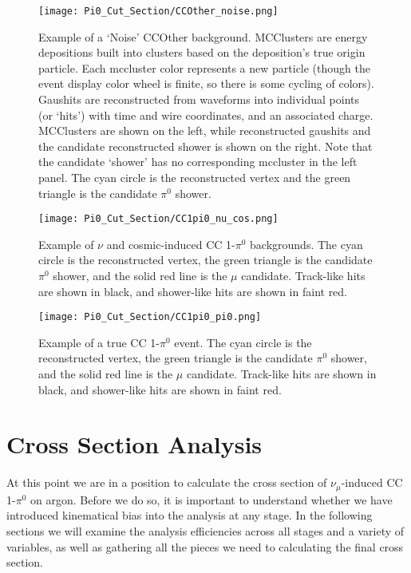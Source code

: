 \begin{figure}[H]
\centering
\texttt{[image: Pi0\_Cut\_Section/CCOther\_noise.png]}
\caption{ Example of a `Noise' CCOther background. MCClusters are energy depositions built into clusters based on the deposition’s true origin particle. Each mccluster color represents a new particle (though the event display color wheel is finite, so there is some cycling of colors).  Gaushits are reconstructed from waveforms into individual points (or `hits') with time and wire coordinates, and an associated charge. MCClusters are shown on the left, while reconstructed gaushits and the candidate reconstructed shower is shown on the right.
 Note that the candidate `shower' has no corresponding mccluster in the left panel. The cyan circle is the reconstructed vertex and the green triangle is the candidate $\pi^0$ shower.  }
\label{fig:ccoth_bkgd_noise}
\end{figure}

\begin{figure}[H]
\centering
\texttt{[image: Pi0\_Cut\_Section/CC1pi0\_nu\_cos.png]}
\caption{ Example of $\nu$ and cosmic-induced CC 1-$\pi^0$ backgrounds. The cyan circle is the reconstructed vertex, the green triangle is the candidate $\pi^0$ shower, and the solid red line is the $\mu$ candidate. Track-like hits are shown in black, and shower-like hits are shown in faint red. }
\label{fig:cc1pi0_nu_cos}
\end{figure}

\begin{figure}[H]
\centering
\texttt{[image: Pi0\_Cut\_Section/CC1pi0\_pi0.png]}
\caption{ Example of a true CC 1-$\pi^0$ event. The cyan circle is the reconstructed vertex, the green triangle is the candidate $\pi^0$ shower, and the solid red line is the $\mu$ candidate. Track-like hits are shown in black, and shower-like hits are shown in faint red. }
\label{fig:cc1pi0_pi0}
\end{figure}





\clearpage
\section{Cross Section Analysis}
\par At this point we are in a position to calculate the cross section of $\nu_\mu$-induced CC 1-$\pi^0$ on argon.  Before we do so, it is important to understand whether we have introduced kinematical bias into the analysis at any stage.  In the following sections we will examine the analysis efficiencies across all stages and a variety of variables, as well as gathering all the pieces we need to calculating the final cross section.

